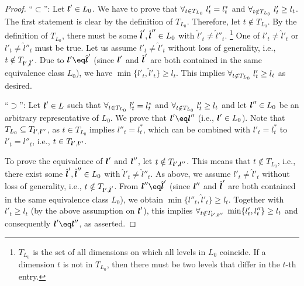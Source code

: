 \begin{proof}
  ``$\subset$'':
  Let ${\boldsymbol{l}}' \in L_0$.
  We have to prove that
  $\forall_{t \in T_{L_0}}\;l'_t = l^\ast_t$ and
  $\forall_{t \notin T_{L_0}}\;l'_t \ge l_t$.
  The first statement is clear by the definition of $T_{L_0}$.
  Therefore, let $t \notin T_{L_0}$.
  By the definition of $T_{L_0}$,
  there must be some $\hat{{\boldsymbol{l}}}', \hat{{\boldsymbol{l}}}'' \in L_0$ with
  $\hat{l}'_t \not= \hat{l}''_t$.%
  \footnote{%
    $T_{L_0}$ is the set of all dimensions on which all levels
    in $L_0$ coincide.
    If a dimension $t$ is not in $T_{L_0}$, then there must be two levels
    that differ in the $t$-th entry.%
  }
  One of $l'_t \not= \hat{l}'_t$ or $l'_t \not= \hat{l}''_t$ must be true.
  Let us assume $l'_t \not= \hat{l}'_t$ without loss of generality, i.e.,
  $t \notin T_{{\boldsymbol{l}}',\hat{{\boldsymbol{l}}}'}$.
  Due to $\*l' \eq \hat{\*l}'$
  (since ${\boldsymbol{l}}'$ and $\hat{{\boldsymbol{l}}}'$ are both contained in the same
  equivalence class $L_0$),
  we have $\min\{l'_t, \hat{l}'_t\} \ge l_t$.
  This implies $\forall_{t \notin T_{L_0}}\;l'_t \ge l_t$ as desired.
  
  ``$\supset$'':
  Let ${\boldsymbol{l}}' \in L$ such that
  $\forall_{t \in T_{L_0}}\;l'_t = l^\ast_t$ and
  $\forall_{t \notin T_{L_0}}\;l'_t \ge l_t$
  and let ${\boldsymbol{l}}'' \in L_0$ be an arbitrary representative of $L_0$.
  We prove that $\*l' \eq \*l''$ (i.e., ${\boldsymbol{l}}' \in L_0$).
  Note that $T_{L_0} \subseteq T_{{\boldsymbol{l}}',{\boldsymbol{l}}''}$,
  as $t \in T_{L_0}$ implies
  $l''_t = l^\ast_t$, which can be combined with $l'_t = l^\ast_t$
  to $l'_t = l''_t$, i.e., $t \in T_{{\boldsymbol{l}}',{\boldsymbol{l}}''}$.
  
  To prove the equivalence of ${\boldsymbol{l}}'$ and ${\boldsymbol{l}}''$,
  let $t \notin T_{{\boldsymbol{l}}',{\boldsymbol{l}}''}$.
  This means that $t \notin T_{L_0}$, i.e.,
  there exist some
  $\hat{{\boldsymbol{l}}}', \hat{{\boldsymbol{l}}}'' \in L_0$ with
  $\hat{l}'_t \not= \hat{l}''_t$.
  As above, we assume $l'_t \not= \hat{l}'_t$ without loss of generality, i.e.,
  $t \notin T_{{\boldsymbol{l}}',\hat{{\boldsymbol{l}}}'}$.
  From $\*l'' \eq \hat{\*l}'$
  (since ${\boldsymbol{l}}''$ and $\hat{{\boldsymbol{l}}}'$ are both contained in the same
  equivalence class $L_0$),
  we obtain $\min\{l''_t, \hat{l}'_t\} \ge l_t$.
  Together with $l'_t \ge l_t$ (by the above assumption on ${\boldsymbol{l}}'$),
  this implies
  $\forall_{t \notin T_{{\boldsymbol{l}}',{\boldsymbol{l}}''}}\;\min\{l'_t, l''_t\} \ge l_t$
  and consequently $\*l' \eq \*l''$,
  as asserted.
\end{proof}

\propCombiTechniqueZero*

